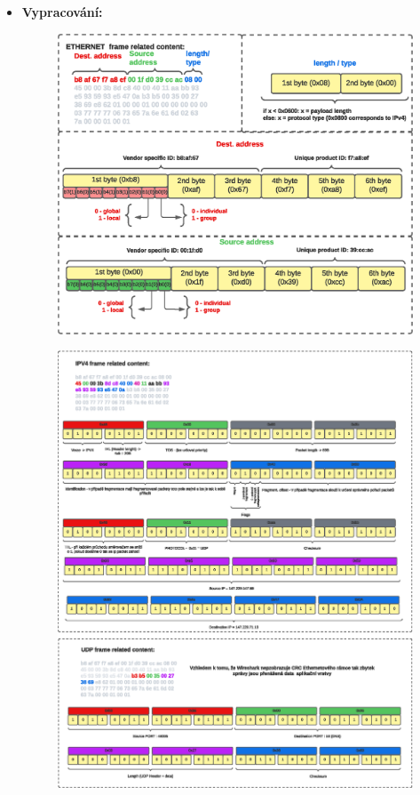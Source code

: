 \documentclass[10pt, a4paper]{article}%
\begin{document}
\begin{itemize}[label={}]
		\item \textbf{Vypracování:}\\
		\begin{figure}[ht!]
			\centering
			\includegraphics[width = 1\textwidth]{pictures/ETHERNET.eps}
		\end{figure}
		\clearpage
		\begin{figure}[ht!]
			\centering
			\includegraphics[width = 1\textwidth]{pictures/IPUDP.eps}
		\end{figure}

		\end{itemize}
	
\end{document}
